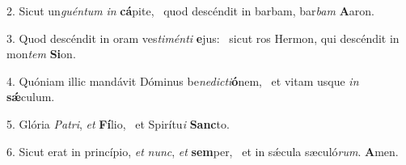2. Sicut un\textit{guén}\textit{tum} \textit{in} \textbf{cá}pite, \ast\  quod descéndit in barbam, bar\textit{bam} \textbf{A}aron.\

3. Quod descéndit in oram ves\textit{ti}\textit{mén}\textit{ti} \textbf{e}jus: \ast\  sicut ros Hermon, qui descéndit in mon\textit{tem} \textbf{Si}on.\

4. Quóniam illic mandávit Dóminus be\textit{ne}\textit{dic}\textit{ti}\textbf{ó}nem, \ast\  et vitam usque \textit{in} \textbf{sǽ}culum.\

5. Glória \textit{Pa}\textit{tri}, \textit{et} \textbf{Fí}lio, \ast\  et Spirítu\textit{i} \textbf{Sanc}to.\

6. Sicut erat in princípio, \textit{et} \textit{nunc}, \textit{et} \textbf{sem}per, \ast\  et in sǽcula sæculó\textit{rum}. \textbf{A}men.\

